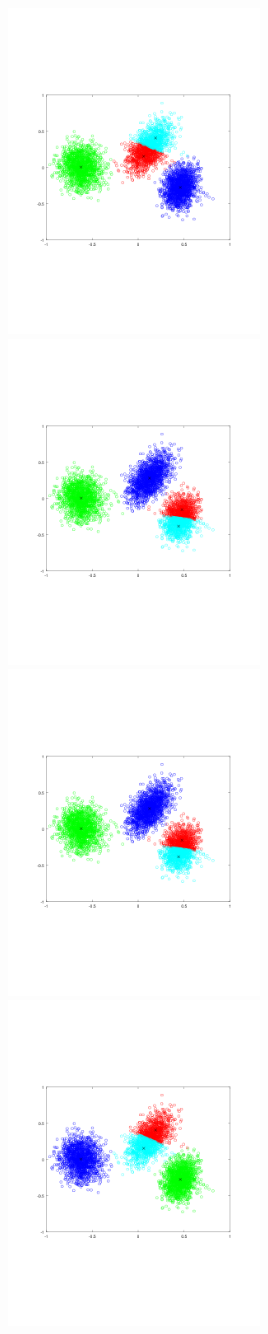 \documentclass[11pt]{article}
\begin{document}
\includegraphics[width=0.5\textwidth]{q4/k4_1.png}
\includegraphics[width=0.5\textwidth]{q4/k4_2.png}
\includegraphics[width=0.5\textwidth]{q4/k4_3.png}
\includegraphics[width=0.5\textwidth]{q4/k4_4.png}
\end{document}
